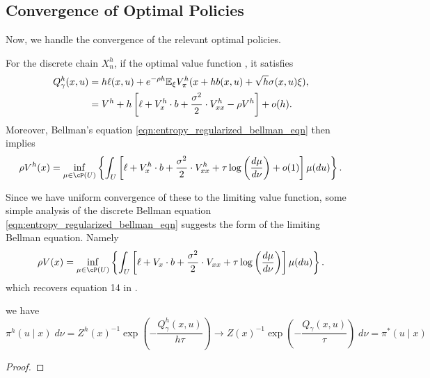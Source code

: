 \subsection{Convergence of Optimal Policies}

\noindent Now, we handle the convergence of the relevant optimal policies.

 For the discrete chain $X^h_n$, if  the optimal value function , it satisfies
%
\begin{align*}
	Q^h_\gamma(x,u) & = h \ell(x,u) + e^{-\rho h} \mathbb{E}_\xi V^h_\pi(x + h b(x,u) + \sqrt{h} \sigma(x,u) \xi), \\
					& = V^h + h \left[\ell + V_x^h \cdot b + \frac{\sigma^2}{2} \cdot V_{xx}^h - \rho V^h\right] + o(h).
\end{align*}
%
\noindent Moreover, Bellman's equation \eqref{eqn:entropy_regularized_bellman_eqn} then implies
%
\[\rho V^h(x) = \inf_{\mu \in \cP(U)} \left\{\int_U \left[\ell + V_x^h \cdot b + \frac{\sigma^2}{2} \cdot V_{xx}^h + \tau \log\left(\frac{d\mu}{d\nu}\right) + o(1)\right] \mu(du)\right\}. \]
%

\noindent Since we have uniform convergence of these to the limiting value function, some simple analysis
of the discrete Bellman equation \eqref{eqn:entropy_regularized_bellman_eqn} suggests the form of the
limiting Bellman equation. Namely
%
\[\rho V(x) = \inf_{\mu \in \cP(U)} \left\{\int_U \left[\ell + V_x\cdot b + \frac{\sigma^2}{2} \cdot V_{xx} + \tau \log\left(\frac{d\mu}{d\nu}\right) \right] \mu(du)\right\}. \]
%
\noindent which recovers equation 14 in \cite{wang2020_reinforcement_learning_stochastic_control}.

\begin{lemma}
	 we have 
	\[\pi^h(u \mid x) \; d\nu = Z^h(x)^{-1}\exp\left(-\frac{Q^h_\gamma(x,u)}{h\tau} \right) \to Z(x)^{-1}\exp\left(-\frac{Q_\gamma(x,u)}{\tau} \right) \; d\nu = \pi^*(u \mid x)\]
\end{lemma}

\begin{proof}

\end{proof}










